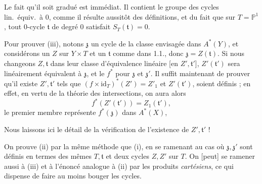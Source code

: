\documentclass[11pt,a4paper]{article}
\begin{document}


Le fait qu'il soit gradué est immédiat. Il contient le groupe des cycles
lin.\ équiv.\ à $0$, comme il résulte aussitôt des définitions, et du fait que
sur $T = \mathbb{P}^{1}$, tout $0$-cycle $\mathfrak{t}$ de degré $0$ satisfait
$S_{T}(\mathfrak{t}) = 0$. 

Pour prouver (iii), notons $\mathfrak{z}$ un cycle de la classe envisagée
dans $A^{*}(Y)$, et considérons un $Z$ sur $Y \times T$ et un $\mathfrak{t}$
comme dans 1.1., donc $\mathfrak{z} = Z(\mathfrak{t})$. Si nous changeons $Z,
\mathfrak{t}$ dans leur classe d'équivalence linéaire [en $Z', \mathfrak{t}'$],
$Z'(\mathfrak{t}')$ sera linéairement équivalent à $\mathfrak{z}$, et le
$f^{*}$  pour $\mathfrak{z}$ et $\mathfrak{z}'$. Il
suffit maintenant de prouver qu'il existe $Z', \mathfrak{t}'$ tels que
$(f \times \mathrm{id}_{T})^{*}(Z') = Z'_{1}$ et $Z'(\mathfrak{t}')$,
 soient définis ; en effet, en vertu de la
théorie des intersections, on aura alors
\[
  f^{*}(Z'(\mathfrak{t}')) = Z_{1}(\mathfrak{t}'),
\]
le premier membre  représente
$f^{*}(\mathfrak{z})$ dans $A^{*}(X)$, 



Nous laissons ici le détail de la vérification de l'existence de $Z',
\mathfrak{t}'$ !

On prouve (ii) par  la même méthode que (i), \struck{\ill{}} en se
ramenant au cas où $\mathfrak{z}, \mathfrak{z}'$ sont définis en termes des
mêmes $T, \mathfrak{t}$ et deux cycles $Z, Z'$ sur $T$. On [peut] se ramener
aussi à (iii) et à l'énoncé analogue à (ii) par les produits
\emph{cartésiens}, ce qui dispense de faire au moins bouger les cycles.
\end{document}
